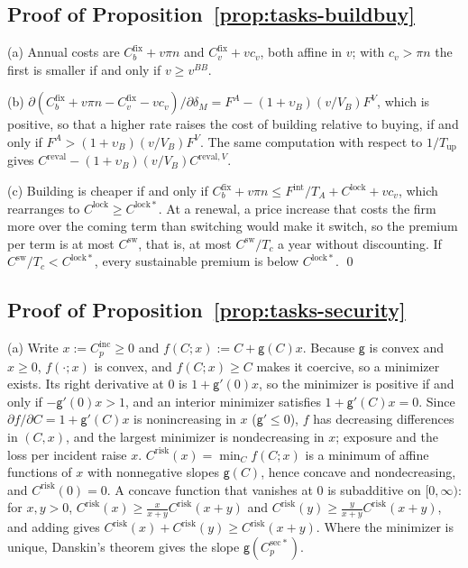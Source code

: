 \subsection*{Proof of Proposition~\ref{prop:tasks-buildbuy}}

(a) Annual costs are $C^{\mathrm{fix}}_b+v\pi n$ and $C^{\mathrm{fix}}_v+vc_v$, both affine in $v$; with $c_v>\pi n$ the first is smaller if and only if $v\ge v^{BB}$.

(b) $\partial(C^{\mathrm{fix}}_b+v\pi n-C^{\mathrm{fix}}_v-vc_v)/\partial\delta_M=F^A-(1+\upsilon_B)(v/V_B)F^V$, which is positive, so that a higher rate raises the cost of building relative to buying, if and only if $F^A>(1+\upsilon_B)(v/V_B)F^V$. The same computation with respect to $1/T_{\mathrm{up}}$ gives $C^{\mathrm{reval}}-(1+\upsilon_B)(v/V_B)C^{\mathrm{reval},V}$.

(c) Building is cheaper if and only if $C^{\mathrm{fix}}_b+v\pi n\le F^{\mathrm{int}}/T_A+C^{\mathrm{lock}}+vc_v$, which rearranges to $C^{\mathrm{lock}}\ge C^{\mathrm{lock}*}$. At a renewal, a price increase that costs the firm more over the coming term than switching would make it switch, so the premium per term is at most $C^{\mathrm{sw}}$, that is, at most $C^{\mathrm{sw}}/T_c$ a year without discounting. If $C^{\mathrm{sw}}/T_c<C^{\mathrm{lock}*}$, every sustainable premium is below $C^{\mathrm{lock}*}$. \qed

\subsection*{Proof of Proposition~\ref{prop:tasks-security}}

(a) Write $x:=C^{\mathrm{inc}}_p\ge 0$ and $f(C;x):=C+\mathsf g(C)x$. Because $\mathsf g$ is convex and $x\ge 0$, $f(\cdot;x)$ is convex, and $f(C;x)\ge C$ makes it coercive, so a minimizer exists. Its right derivative at $0$ is $1+\mathsf g'(0)x$, so the minimizer is positive if and only if $-\mathsf g'(0)x>1$, and an interior minimizer satisfies $1+\mathsf g'(C)x=0$. Since $\partial f/\partial C=1+\mathsf g'(C)x$ is nonincreasing in $x$ ($\mathsf g'\le 0$), $f$ has decreasing differences in $(C,x)$, and the largest minimizer is nondecreasing in $x$; exposure and the loss per incident raise $x$. $C^{\mathrm{risk}}(x)=\min_Cf(C;x)$ is a minimum of affine functions of $x$ with nonnegative slopes $\mathsf g(C)$, hence concave and nondecreasing, and $C^{\mathrm{risk}}(0)=0$. A concave function that vanishes at $0$ is subadditive on $[0,\infty)$: for $x,y>0$, $C^{\mathrm{risk}}(x)\ge\frac{x}{x+y}C^{\mathrm{risk}}(x+y)$ and $C^{\mathrm{risk}}(y)\ge\frac{y}{x+y}C^{\mathrm{risk}}(x+y)$, and adding gives $C^{\mathrm{risk}}(x)+C^{\mathrm{risk}}(y)\ge C^{\mathrm{risk}}(x+y)$. Where the minimizer is unique, Danskin's theorem gives the slope $\mathsf g(C^{\mathrm{sec}*}_p)$.

